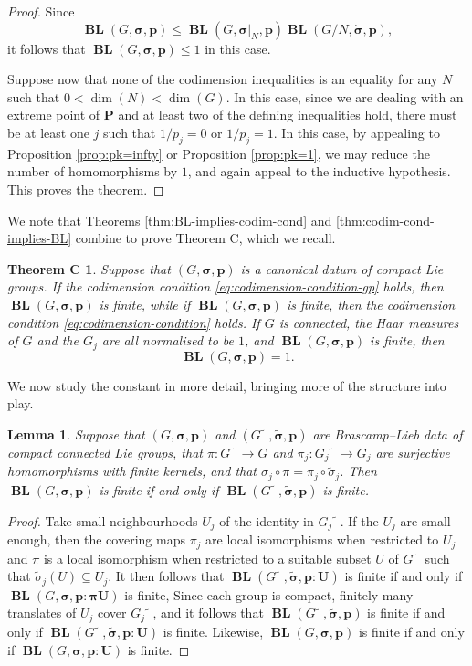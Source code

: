 \documentclass[12pt,twoside,a4paper]{amsart}
\newtheorem*{thmC}{Theorem C}
\newtheorem{lem}[thm]{Lemma}%
\theoremstyle{definition}
\theoremstyle{remark}
\numberwithin{equation}{section}
\newcommand{\aftertilde}{\tilde{\phantom{n}}}
\newcommand{\BL}{\operatorname{\mathbf{BL}}}
\newcommand{\bss}{\boldsymbol{\sigma}}
\newcommand{\bsds}{\boldsymbol{\dot\sigma}}
\newcommand{\bsts}{\boldsymbol{\tilde\sigma}}
\newcommand{\bspi}{\boldsymbol{\pi}}
\newcommand{\Polytope}{\boldsymbol{P}}
\newcommand{\bsp}{\boldsymbol{p}}
\newcommand{\bsU}{\boldsymbol{U}}
\begin{document}
\begin{proof}
Since
\[
\BL(G, \bss, \bsp) \leq \BL(G, \bss|_N, \bsp) \BL(G/N, \bsds, \bsp), 
\]
it follows that $\BL(G, \bss, \bsp) \leq 1$ in this case.

Suppose now that none of the codimension inequalities is an equality for any $N$ such that  $0 < \dim(N) < \dim(G)$.
In this case, since we are dealing with an extreme point of $\Polytope$ and at least two of the defining inequalities hold, there must be at least one $j$ such that $1/p_j = 0$ or $1/p_j = 1$.
In this case, by appealing to Proposition \ref{prop:pk=infty} or Proposition \ref{prop:pk=1}, we may reduce the number of homomorphisms by $1$, and again appeal to the inductive hypothesis.
This proves the theorem.
\end{proof}

We note that Theorems \ref{thm:BL-implies-codim-cond} and \ref{thm:codim-cond-implies-BL} combine to prove Theorem C, which we recall.

\begin{thmC}
Suppose that $(G,\bss,\bsp)$ is a canonical datum of compact Lie groups.
If the codimension condition \eqref{eq:codimension-condition-gp} holds, then $\BL(G,\bss,\bsp)$ is finite, while if $\BL(G,\bss,\bsp)$ is finite, then the codimension condition \eqref{eq:codimension-condition} holds.
If $G$ is connected, the Haar measures of $G$ and the $G_j$ are all normalised to be $1$, and $\BL(G,\bss,\bsp)$ is finite, then 
\[
\BL(G, \bss, \bsp)=1.
\]
\end{thmC}

We now study the constant in more detail, bringing more of the structure into play.

\begin{lem}
Suppose that  $(G, \bss, \bsp)$ and $(G\aftertilde, \bsts, \bsp)$ are Brascamp--Lieb data of compact connected Lie groups, that $\pi\colon  G\aftertilde \to G$ and $\pi_j\colon  G_j\aftertilde  \to G_j$ are surjective homomorphisms with finite kernels, and that $\sigma_j \circ \pi = \pi_j \circ \tilde{\sigma}_j$.
Then $\BL(G, \bss, \bsp)$ is finite if and only if $\BL(G\aftertilde, \bsts, \bsp)$ is finite.
\end{lem}

\begin{proof}
Take small neighbourhoods $U_j$ of the identity in $G_j\aftertilde$.
If the $U_j$ are small enough, then the covering maps $\pi_j$ are local isomorphisms when restricted to $U_j$ and $\pi$ is a local isomorphism when restricted to a suitable subset $U$ of $G\aftertilde$ such that $\tilde\sigma_j(U) \subseteq U_j$.
It then follows that $\BL(G\aftertilde, \bsts, \bsp: \bsU)$ is finite if and only if $\BL(G, \bss, \bsp: \bspi\bsU)$ is finite, 
Since each group is compact, finitely many translates of $U_j$ cover $G_j\aftertilde$, and it follows that $\BL(G\aftertilde, \bsts, \bsp)$ is finite if and only if $\BL(G\aftertilde, \bsts, \bsp: \bsU)$ is finite.
Likewise, $\BL(G, \bss, \bsp)$ is finite if and only if $\BL(G, \bss, \bsp: \bsU)$ is finite.
\end{proof}
\end{document}
